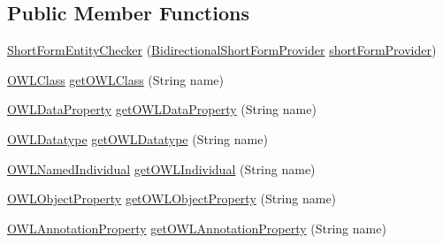 \subsection*{Public Member Functions}
\begin{DoxyCompactItemize}
\item 
\hyperlink{classorg_1_1semanticweb_1_1owlapi_1_1expression_1_1_short_form_entity_checker_aa754983313a7de92f4344f2eb703a001}{Short\-Form\-Entity\-Checker} (\hyperlink{interfaceorg_1_1semanticweb_1_1owlapi_1_1util_1_1_bidirectional_short_form_provider}{Bidirectional\-Short\-Form\-Provider} \hyperlink{classorg_1_1semanticweb_1_1owlapi_1_1expression_1_1_short_form_entity_checker_a98bf6a7bec1e62074cbb1eff7746771b}{short\-Form\-Provider})
\item 
\hyperlink{interfaceorg_1_1semanticweb_1_1owlapi_1_1model_1_1_o_w_l_class}{O\-W\-L\-Class} \hyperlink{classorg_1_1semanticweb_1_1owlapi_1_1expression_1_1_short_form_entity_checker_a4e3ec2b6fa206c720d7c6a54e01c7318}{get\-O\-W\-L\-Class} (String name)
\item 
\hyperlink{interfaceorg_1_1semanticweb_1_1owlapi_1_1model_1_1_o_w_l_data_property}{O\-W\-L\-Data\-Property} \hyperlink{classorg_1_1semanticweb_1_1owlapi_1_1expression_1_1_short_form_entity_checker_a3637ed0dffb8fab38994f076e996cdff}{get\-O\-W\-L\-Data\-Property} (String name)
\item 
\hyperlink{interfaceorg_1_1semanticweb_1_1owlapi_1_1model_1_1_o_w_l_datatype}{O\-W\-L\-Datatype} \hyperlink{classorg_1_1semanticweb_1_1owlapi_1_1expression_1_1_short_form_entity_checker_ac179b3a75f07c518272329ffb1fc32ea}{get\-O\-W\-L\-Datatype} (String name)
\item 
\hyperlink{interfaceorg_1_1semanticweb_1_1owlapi_1_1model_1_1_o_w_l_named_individual}{O\-W\-L\-Named\-Individual} \hyperlink{classorg_1_1semanticweb_1_1owlapi_1_1expression_1_1_short_form_entity_checker_a2d6e7c80177baaafc2dd01c0aade09e9}{get\-O\-W\-L\-Individual} (String name)
\item 
\hyperlink{interfaceorg_1_1semanticweb_1_1owlapi_1_1model_1_1_o_w_l_object_property}{O\-W\-L\-Object\-Property} \hyperlink{classorg_1_1semanticweb_1_1owlapi_1_1expression_1_1_short_form_entity_checker_ab62c783ba1929e555758743cc35733cf}{get\-O\-W\-L\-Object\-Property} (String name)
\item 
\hyperlink{interfaceorg_1_1semanticweb_1_1owlapi_1_1model_1_1_o_w_l_annotation_property}{O\-W\-L\-Annotation\-Property} \hyperlink{classorg_1_1semanticweb_1_1owlapi_1_1expression_1_1_short_form_entity_checker_aef8994204358f21b1961f41dfb42986c}{get\-O\-W\-L\-Annotation\-Property} (String name)
\end{DoxyCompactItemize}
